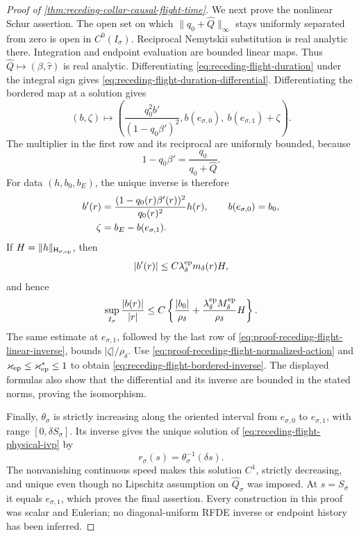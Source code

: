 \begin{proof}[Proof of
\cref{thm:receding-collar-causal-flight-time}]
We next prove the nonlinear Schur assertion.  The open set on which
\(\|q_0+\widehat Q\|_\infty\) stays uniformly separated from zero is open
in \(C^0(I_\sigma)\).  Reciprocal Nemytskii substitution is real analytic
there.  Integration and endpoint evaluation are bounded linear maps.
Thus
\(\widehat Q\mapsto(\beta,\widehat\tau)\) is real analytic.
Differentiating \cref{eq:receding-flight-duration} under the integral sign
gives \cref{eq:receding-flight-duration-differential}.
Differentiating the bordered map at a solution gives
\begin{equation}
 (b,\zeta)\longmapsto
 \left(
   \frac{q_0^2b'}{(1-q_0\beta')^2},
   b(e_{\sigma,0}),\
   b(e_{\sigma,1})+\zeta\right).                 \label{eq:proof-receding-flight-differential}
\end{equation}
The multiplier in the first row and its reciprocal are uniformly bounded,
because
\[
 1-q_0\beta'=\frac{q_0}{q_0+\widehat Q}.
\]
For data \((h,b_0,b_E)\), the unique inverse is therefore
\begin{align}
 b'(r)&=\frac{(1-q_0(r)\beta'(r))^2}{q_0(r)^2}h(r),
 \qquad b(e_{\sigma,0})=b_0,\notag\\
 \zeta&=b_E-b(e_{\sigma,1}).                     \label{eq:proof-receding-flight-linear-inverse}
\end{align}
If \(H=\|h\|_{\mathsf H_{\sigma,{\rm ep}}}\), then
\[
 |b'(r)|\le C\lambda_\delta^{\rm ep}m_\delta(r)H,
\]
and hence
\[
 \sup_{I_\sigma}\frac{|b(r)|}{|r|}
 \le C\left\{\frac{|b_0|}{\rho_\delta}
       +\frac{\lambda_\delta^{\rm ep}M_\delta^{\rm ep}}
              {\rho_\delta}H\right\}.
\]
The same estimate at \(e_{\sigma,1}\), followed by the last row of
\cref{eq:proof-receding-flight-linear-inverse}, bounds
\(|\zeta|/\rho_\delta\).  Use
\cref{eq:proof-receding-flight-normalized-action} and
\(\varkappa_{\rm ep}\le\varkappa_{\rm ep}^*\le1\) to obtain
\cref{eq:receding-flight-bordered-inverse}.  The displayed formulas also
show that the differential and its inverse are bounded in the stated
norms, proving the isomorphism.

Finally, \(\theta_\sigma\) is strictly increasing along the oriented
interval from \(e_{\sigma,0}\) to \(e_{\sigma,1}\), with range
\([0,\delta S_\sigma]\).  Its inverse gives the unique solution of
\cref{eq:receding-flight-physical-ivp} by
\[
 r_\sigma(s)=\theta_\sigma^{-1}(\delta s).
\]
The nonvanishing continuous speed makes this solution \(C^1\), strictly
decreasing, and unique even though no Lipschitz assumption on
\(\widehat Q_\sigma\) was imposed.  At \(s=S_\sigma\) it equals
\(e_{\sigma,1}\), which proves the final assertion.  Every construction
in this proof was scalar and Eulerian; no diagonal-uniform RFDE inverse or
endpoint history has been inferred.
\end{proof}

